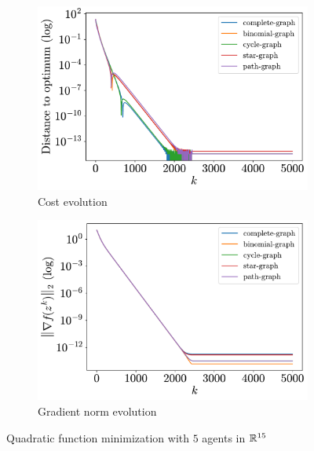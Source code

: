 \documentclass[a4paper,11pt,oneside]{book}
\begin{document}
\begin{figure}[H]
      \centering
      \begin{subfigure}[t]{0.46\linewidth}
            \centering
            \includegraphics[width=\linewidth]{./figs/quadratic/5_15/distance.pdf} 
            \caption{Cost evolution}
      \end{subfigure}
      \hfill
      \begin{subfigure}[t]{0.46\linewidth}
            \centering
            \includegraphics[width=\linewidth]{./figs/quadratic/5_15/gradient.pdf} 
            \caption{Gradient norm evolution}
      \end{subfigure}
      \caption{Quadratic function minimization with $5$ agents in ${\mathbb{R}}^{15}$}
      \label{fig:quadratic_5_15}
\end{figure}
\end{document}
